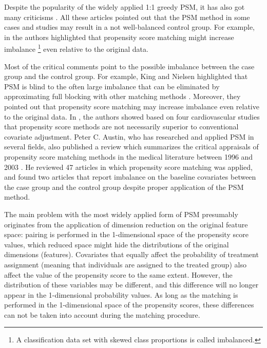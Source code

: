 Despite the popularity of the widely applied 1:1 greedy PSM, it has also got many criticisms \cite{pell2008selection, moser2019out,   biondi2011propensity, mansournia2018case, wan2019matched, king2019propensity, austin2008critical}. All these articles pointed out that the PSM method in some cases and studies may result in a not well-balanced control group. For example, in \cite{king2019propensity} the authors highlighted that propensity score matching might increase imbalance \footnote{A classification data set with skewed class proportions is called imbalanced.} even relative to the original data.

Most of the critical comments point to the possible imbalance between the case group and the control group. For example, King and Nielsen highlighted that PSM is blind to the often large imbalance that can be eliminated by approximating full blocking with other matching methods \cite{king2019propensity}. Moreover, they pointed out that propensity score matching may increase imbalance even relative to the original data. In \cite{elze2017comparison}, the authors showed based on four cardiovascular studies that propensity score methods are not necessarily superior to conventional covariate adjustment. Peter C. Austin, who has researched and applied PSM in several fields, also published a review which summarizes the critical appraisals of propensity score matching methods in the medical literature between 1996 and 2003 \cite{austin2008critical}. He reviewed 47 articles in which propensity score matching was applied, and found two articles that report imbalance on the baseline covariates between the case group and the control group despite proper application of the PSM method.

The main problem with the most widely applied form of PSM presumably originates from the application of dimension reduction on the original feature space: pairing is performed in the 1-dimensional space of the propensity score values, which reduced space might hide the distributions of the original dimensions (features). Covariates that equally affect the probability of treatment assignment (meaning that individuals are assigned to the treated group) also affect the value of the propensity score to the same extent. However, the distribution of these variables may be different, and this difference will no longer appear in the 1-dimensional probability values. As long as the matching is performed in the 1-dimensional space of the propensity scores, these differences can not be taken into account during the matching procedure.

